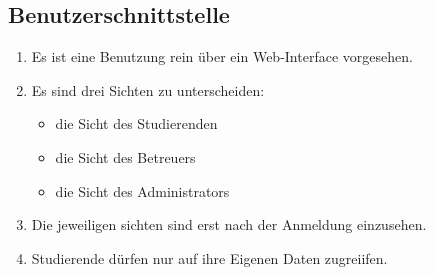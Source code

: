 \documentclass[parskip=full]{scrartcl}
\begin{document}
\subsection{Benutzerschnittstelle}
\begin{enumerate}
  \item Es ist eine Benutzung rein über ein Web-Interface vorgesehen.
  \item Es sind drei Sichten zu unterscheiden:
        \begin{itemize}
          \item die Sicht des Studierenden
          \item die Sicht des Betreuers
          \item die Sicht des Administrators
        \end{itemize}
  \item Die jeweiligen sichten sind erst nach der Anmeldung einzusehen. 
  \item Studierende dürfen nur auf ihre Eigenen Daten zugreiifen.
  
\end{enumerate}
\printglossaries
\end{document}
